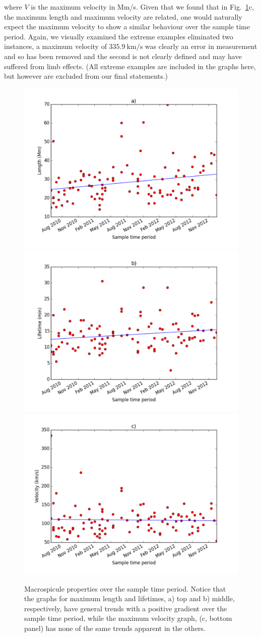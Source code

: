 \noindent where $V$ is the maximum velocity in Mm/s. Given that we found that in Fig.~\ref{fig:sol-cyc-rels}c, the maximum length and maximum velocity are related, one would naturally expect the maximum velocity to show a similar behaviour over the sample time period. Again, we visually examined the extreme examples eliminated two instances, a maximum velocity of $335.9\ \textrm{km/s}$ was clearly an error in measurement and so has been removed and the second is not clearly defined and may have suffered from limb effects. (All extreme examples are included in the graphs here, but however are excluded from our final statements.)

\begin{figure}[h]
	\centering
	\includegraphics[width=0.4\columnwidth]{Chapter3/Figs/length_vs_solarcycle.pdf}
	\includegraphics[width=0.4\columnwidth]{Chapter3/Figs/life_vs_solarcycle.pdf}
	\includegraphics[width=0.4\columnwidth]{Chapter3/Figs/velocity_vs_solarcycle.pdf}
	\caption{\small Macrospicule properties over the sample time period. Notice that the graphs for maximum length and lifetimes, a) top and b) middle, respectively, have general trends with a positive gradient over the sample time period, while the maximum velocity graph, (c, bottom panel) has none of the same trends apparent in the others.}
	\label{fig:sol-cyc-rels}
\end{figure}



